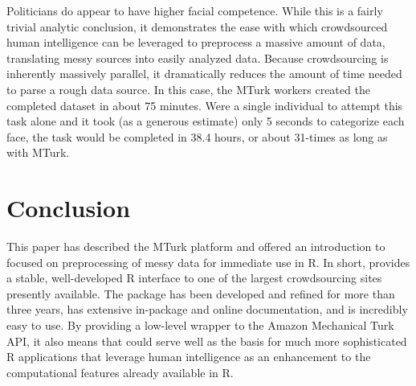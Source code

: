 Politicians do appear to have higher facial competence. While this is a fairly trivial analytic conclusion, it demonstrates the ease with which crowdsourced human intelligence can be leveraged to preprocess a massive amount of data, translating messy sources into easily analyzed data. Because crowdsourcing is inherently massively parallel, it dramatically reduces the amount of time needed to parse a rough data source. In this case, the MTurk workers created the completed dataset in about 75 minutes. Were a single individual to attempt this task alone and it took (as a generous estimate) only 5 seconds to categorize each face, the task would be completed in 38.4 hours, or about 31-times as long as with MTurk.

\section{Conclusion}

This paper has described the MTurk platform and offered an introduction to  focused on preprocessing of messy data for immediate use in R. In short,  provides a stable, well-developed R interface to one of the largest crowdsourcing sites presently available. The package has been developed and refined for more than three years, has extensive in-package and online documentation, and is incredibly easy to use. By providing a low-level wrapper to the Amazon Mechanical Turk API, it also means that  could serve well as the basis for much more sophisticated R applications that leverage human intelligence as an enhancement to the computational features already available in R.



\address{Thomas J. Leeper\\
Department of Government\\
London School of Economics and Political Science\\
London, United Kingdom}\\
